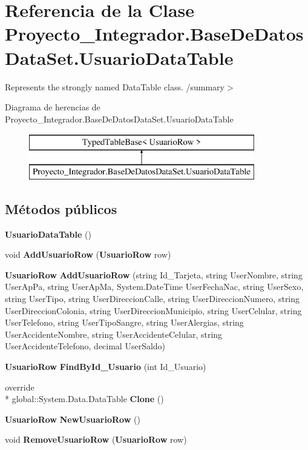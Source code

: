 \section{Referencia de la Clase Proyecto\-\_\-\-Integrador.\-Base\-De\-Datos\-Data\-Set.\-Usuario\-Data\-Table}
\label{class_proyecto___integrador_1_1_base_de_datos_data_set_1_1_usuario_data_table}


Represents the strongly named Data\-Table class. /summary$>$  


Diagrama de herencias de Proyecto\-\_\-\-Integrador.\-Base\-De\-Datos\-Data\-Set.\-Usuario\-Data\-Table\begin{figure}[H]
\begin{center}
\leavevmode
\includegraphics[height=2.000000cm]{class_proyecto___integrador_1_1_base_de_datos_data_set_1_1_usuario_data_table}
\end{center}
\end{figure}
\subsection*{Métodos públicos}
\begin{DoxyCompactItemize}
\item 
{\bf Usuario\-Data\-Table} ()
\item 
void {\bf Add\-Usuario\-Row} ({\bf Usuario\-Row} row)
\item 
{\bf Usuario\-Row} {\bf Add\-Usuario\-Row} (string Id\-\_\-\-Tarjeta, string User\-Nombre, string User\-Ap\-Pa, string User\-Ap\-Ma, System.\-Date\-Time User\-Fecha\-Nac, string User\-Sexo, string User\-Tipo, string User\-Direccion\-Calle, string User\-Direccion\-Numero, string User\-Direccion\-Colonia, string User\-Direccion\-Municipio, string User\-Celular, string User\-Telefono, string User\-Tipo\-Sangre, string User\-Alergias, string User\-Accidente\-Nombre, string User\-Accidente\-Celular, string User\-Accidente\-Telefono, decimal User\-Saldo)
\item 
{\bf Usuario\-Row} {\bf Find\-By\-Id\-\_\-\-Usuario} (int Id\-\_\-\-Usuario)
\item 
override \\*
global\-::\-System.\-Data.\-Data\-Table {\bf Clone} ()
\item 
{\bf Usuario\-Row} {\bf New\-Usuario\-Row} ()
\item 
void {\bf Remove\-Usuario\-Row} ({\bf Usuario\-Row} row)
\end{DoxyCompactItemize}
